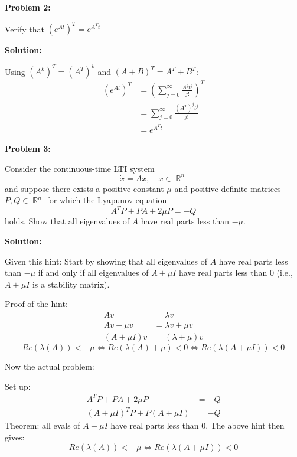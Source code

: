 \documentclass[12pt]{article}
\DeclareMathOperator{\RR}{\mathbb{R}}
\newenvironment{problem}[1]{
    \textbf{Problem #1:}
}{
    \rmfamily \vspace{1em}
}
\newenvironment{solution}{
    \textbf{Solution:}
    
}{
    
    \vspace{2em}
}
\begin{document}
\newpage

\begin{problem}{2}
    Verify that \(\left(e^{At}\right)^T = e^{A^T t}\)
\end{problem}

\begin{solution}
    Using \((A^k)^T = (A^T)^k\) and \((A + B)^T = A^T + B^T\):
    \[
        \begin{aligned}
            \left(e^{At}\right)^T &= \left(\sum_{j=0}^{\infty} \frac{A^j t^j}{j!}\right)^T \\
            &= \sum_{j=0}^{\infty} \frac{(A^T)^j t^j}{j!} \\
            &= e^{A^T t}
        \end{aligned}
    \]
\end{solution}

\newpage

\begin{problem}{3}
    Consider the continuous-time LTI system
    \[
        \dot x = Ax, \quad x \in \RR^n
    \]
    and suppose there exists a positive constant \(\mu\) and positive-definite matrices \(P, Q \in \RR^n\) for which the Lyapunov equation
    \[
        A^T P + P A + 2\mu P = -Q
    \]
    holds. Show that all eigenvalues of \(A\) have real parts less than \(-\mu\).
\end{problem}

\begin{solution}
    Given this hint: Start by showing that all eigenvalues of \(A\) have real parts less than \(-\mu\) if and
    only if all eigenvalues of \(A + \mu I\) have real parts less than 0 (i.e., \(A + \mu I\) is a stability
    matrix).

    Proof of the hint:
    \[
        \begin{aligned}
            Av &= \lambda v \\
            Av + \mu v &= \lambda v + \mu v \\
            (A + \mu I)v &= (\lambda + \mu)v
        \end{aligned}
    \]
    \[
        Re(\lambda(A)) < -\mu \iff Re(\lambda(A) + \mu) < 0 \iff Re(\lambda(A + \mu I)) < 0
    \]

    Now the actual problem:

    Set up:
    \[
        \begin{aligned}
            A^T P + P A + 2\mu P &= -Q \\
            (A + \mu I)^T P + P (A + \mu I) &= -Q
        \end{aligned}
    \]
    Theorem: all evals of \(A + \mu I\) have real parts less than 0. The above hint then gives:
    \[
        Re(\lambda(A)) < -\mu \iff Re(\lambda(A + \mu I)) < 0
    \]

\end{solution}
\end{document}
